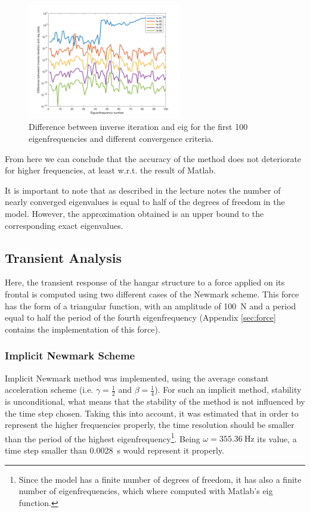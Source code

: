 \documentclass[AMdocument,optEnglish]{AMlatex}  %
\begin{document}
\begin{figure}[ht] 
	\centering
	\includegraphics[width=0.6\textwidth]{differences_tol} 
	\caption{Difference between inverse iteration and eig for the first 100 eigenfrequencies and different convergence criteria.}
	\label{fig:diff-tol}
\end{figure}

From here we can conclude that the accuracy of the method does not deteriorate for higher frequencies, at least w.r.t. the result of Matlab.

It is important to note that as described in the lecture notes \cite{strucdyn-lecnot} the number of nearly converged eigenvalues is equal to half of the degrees of freedom in the model. However, the approximation obtained is an upper bound to the corresponding exact eigenvalues.

\subsection{Transient Analysis}

Here, the transient response of the hangar structure to a force applied on its frontal is computed using two different cases of the Newmark scheme. This force has the form of a triangular function, with an amplitude of \SI{100}{\newton} and a period equal to half the period of the fourth eigenfrequency (Appendix \ref{sec:force} contains the implementation of this force).

\subsubsection{Implicit Newmark Scheme}

Implicit Newmark method was implemented, using the average constant acceleration scheme (i.e. $\gamma = \frac{1}{2}$ and $\beta = \frac{1}{4}$). For such an implicit method, stability is unconditional, what means that the stability of the method is not influenced by the time step chosen. Taking this into account, it was estimated that in order to represent the higher frequencies properly, the time resolution should be smaller than the period of the highest eigenfrequency\footnote{Since the model has a finite number of degrees of freedom, it has also a finite number of eigenfrequencies, which where computed with Matlab's eig function.}. Being $\omega = \SI{355.36}{\hertz}$ its value, a time step smaller than \SI{0.0028}{\second} would represent it properly. 
\end{document}
